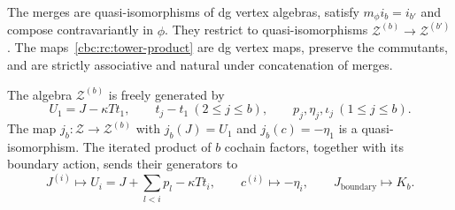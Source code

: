 \begin{proposition}\label{cbc:rc:tower-strict}
The merges are quasi-isomorphisms of dg vertex algebras, satisfy
$m_\phi i_b=i_{b'}$ and compose contravariantly in $\phi$.
They restrict to quasi-isomorphisms
$\mathcal Z^{(b)}\to\mathcal Z^{(b')}$.
The maps~\eqref{cbc:rc:tower-product} are dg vertex maps, preserve
the commutants, and are strictly associative and natural under
concatenation of merges.

The algebra $\mathcal Z^{(b)}$ is freely generated by
\[
 U_1=J-\kappa Tt_1,\qquad
 t_j-t_1\ (2\leq j\leq b),\qquad p_j,\eta_j,\iota_j\ (1\leq j\leq b).
\]
The map $j_b:\mathcal Z\to\mathcal Z^{(b)}$ with
$j_b(J)=U_1$ and $j_b(c)=-\eta_1$ is a quasi-isomorphism.
The iterated product of $b$ cochain factors, together with its
boundary action, sends their generators to
\begin{equation}\label{cbc:rc:tower-currents}
 J^{(i)}\longmapsto U_i=J+\sum_{l<i}p_l-\kappa Tt_i,
 \qquad c^{(i)}\longmapsto-\eta_i,
 \qquad J_{\mathrm{boundary}}\longmapsto K_b.
\end{equation}
\end{proposition}
